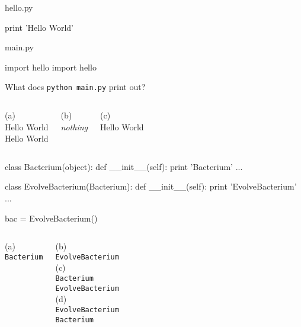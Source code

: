 \begin{frame}[fragile]

\begin{block}{hello.py}
\begin{python}
print 'Hello World'
\end{python}
\end{block}

\begin{block}{main.py}
\begin{python}
import hello
import hello
\end{python}
\end{block}

What does \texttt{python main.py} print out?

\begin{columns}
(a)\\
Hello World\\
Hello World

(b)\\
\textit{nothing}

(c)\\
Hello World
\end{columns}

\end{frame}

\begin{frame}[fragile]
\begin{python}
class Bacterium(object):
    def __init__(self):
        print 'Bacterium'
    ...

class EvolveBacterium(Bacterium):
    def __init__(self):
        print 'EvolveBacterium'
    ...

bac = EvolveBacterium()
\end{python}

\begin{columns}
(a)\\
\verb+Bacterium+

(b)\\
\verb+EvolveBacterium+\\

(c)\\
\verb+Bacterium+\\
\verb+EvolveBacterium+\\

(d)\\
\verb+EvolveBacterium+\\
\verb+Bacterium+\\
\end{columns}

\end{frame}


